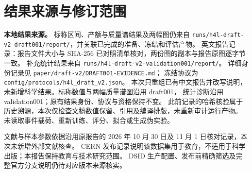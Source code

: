 \documentclass[11pt,a4paper,fontset=fandol,scheme=plain]{ctexart}
\begin{document}
\section{结果来源与修订范围}\label{app:provenance}
\textbf{本地结果来源。} 标称区间、产额与质量谱结果及两幅图仍来自
\nolinkurl{runs/h4l-draft-v2-draft001/report/}，并关联已完成的准备、冻结和评估产物。
英文报告记录：报告文件大小与 SHA-256 已对照清单核对，两份图的副本与报告原图逐字节一致。
补充统计结果来自 \nolinkurl{runs/h4l-draft-v2-validation001/report/}。
详细身份记录见 \nolinkurl{paper/draft-v2/DRAFT001-EVIDENCE.md}；
冻结协议为 \nolinkurl{config/protocols/h4l_draft_v2.json}。
本次只重组已有中文报告并改写说明，未新增科学结果。标称数值与两幅质量谱图沿用 draft001，
统计诊断沿用 validation001；原有结果身份、协议与资格保持不变。
此前记录的哈希核验属于历史溯源，本次仅检查文稿数值保留、引用及编译排版，未重新审计运行产物。
未读取事件载荷、重新训练、评分、拟合或生成伪实验。

文献与样本参数依据沿用原报告的 2026 年 10 月 30 日及 11 月 1 日核对记录，本次未新增外部文献核查。
CERN 发布记录说明该数据集用于教育，不适用于科学出版；本报告保持教育与技术研究范围。
DSID 生产配置、发布前精确筛选及完整官方分支说明仍待对应版本来源核实。
\end{document}

